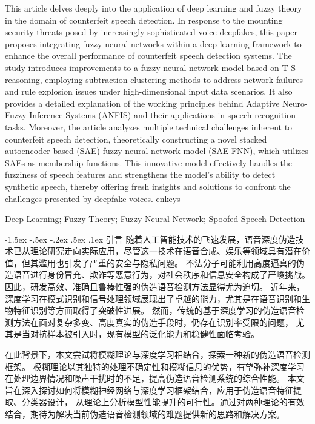 \documentclass[12pt, a4paper]{article}
\makeatletter
\newcommand*{\hei}{\CJKfamily{zhhei}}
\newenvironment{enabstract}
\newenvironment{enkeys}
\newcommand{\sihao}{\fontsize{14pt}{\baselineskip}\selectfont}
\renewcommand\section{\@startsection{section}{1}{\z@}%
{-1.5ex \@plus -.5ex \@minus -.2ex}%
{.5ex \@plus .1ex}%
{\normalfont\sihao\bf\hei}}
\makeatother
\begin{document}
\begin{enabstract}
	This article delves deeply into the application of deep learning and fuzzy theory in the domain of counterfeit speech detection. 
	In response to the mounting security threats posed by increasingly sophisticated voice deepfakes, this paper proposes integrating fuzzy neural networks within a deep learning framework to enhance the overall performance of counterfeit speech detection systems.
    The study introduces improvements to a fuzzy neural network model based on T-S reasoning, employing subtraction clustering methods to address network failures and rule explosion issues under high-dimensional input data scenarios.
	It also provides a detailed explanation of the working principles behind Adaptive Neuro-Fuzzy Inference Systems (ANFIS) and their applications in speech recognition tasks.
    Moreover, the article analyzes multiple technical challenges inherent to counterfeit speech detection, theoretically constructing a novel stacked autoencoder-based (SAE) fuzzy neural network model (SAE-FNN), which utilizes SAEs as membership functions.
	This innovative model effectively handles the fuzziness of speech features and strengthens the model's ability to detect synthetic speech, thereby offering fresh insights and solutions to confront the challenges presented by deepfake voices.
\end{enabstract}

\begin{enkeys}
	Deep Learning; Fuzzy Theory; Fuzzy Neural Network; Spoofed Speech Detection
\end{enkeys}



\section{引言}
随着人工智能技术的飞速发展，语音深度伪造技术已从理论研究走向实际应用，尽管这一技术在语音合成、娱乐等领域具有潜在价值，但其滥用也引发了严重的安全与隐私问题。
不法分子可能利用高度逼真的伪造语音进行身份冒充、欺诈等恶意行为，对社会秩序和信息安全构成了严峻挑战。因此，研发高效、准确且鲁棒性强的伪造语音检测方法显得尤为迫切。
近年来，深度学习在模式识别和信号处理领域展现出了卓越的能力，尤其是在语音识别和生物特征识别等方面取得了突破性进展。
然而，传统的基于深度学习的伪造语音检测方法在面对复杂多变、高度真实的伪造手段时，仍存在识别率受限的问题，
尤其是当对抗样本被引入时，现有模型的泛化能力和稳健性面临考验。
\par
在此背景下，本文尝试将模糊理论与深度学习相结合，探索一种新的伪造语音检测框架。
模糊理论以其独特的处理不确定性和模糊信息的优势，有望弥补深度学习在处理边界情况和噪声干扰时的不足，提高伪造语音检测系统的综合性能。
本文旨在深入探讨如何将模糊神经网络与深度学习框架结合，应用于伪造语音特征提取、分类器设计，
从理论上分析模型性能提升的可行性。通过对两种理论的有效结合，期待为解决当前伪造语音检测领域的难题提供新的思路和解决方案。
\end{document}
